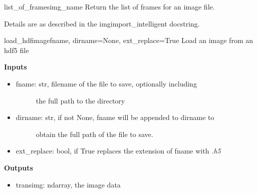 \documentclass[letterpaper,10pt,english]{manual}
\begin{document}
\hypertarget{odysseus.imageio.list_of_frames}{}\begin{funcdesc}{list\_of\_frames}{img\_name}
Return the list of frames for an image file.

Details are as described in the imgimport\_intelligent docstring.
\end{funcdesc}

\hypertarget{odysseus.imageio.load_hdfimage}{}\begin{funcdesc}{load\_hdfimage}{fname, dirname=None, ext\_replace=True}
Load an image from an hdf5 file

\textbf{Inputs}
\begin{itemize}
\item {} \begin{description}
\item[fname: str, filename of the file to save, optionally including] \leavevmode
the full path to the directory

\end{description}

\item {} \begin{description}
\item[dirname: str, if not None, fname will be appended to dirname to] \leavevmode
obtain the full path of the file to save.

\end{description}

\item {} 
ext\_replace: bool, if True replaces the extension of fname with \emph{.h5}

\end{itemize}

\textbf{Outputs}
\begin{itemize}
\item {} 
transimg: ndarray, the image data

\end{itemize}
\end{funcdesc}
\end{document}
